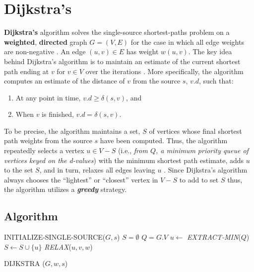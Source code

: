 \documentclass[a4paper, 12pt]{report}
\theoremstyle{definition}
\begin{document}
\section{Dijkstra's}
\label{sec:3.2}
\textbf{Dijkstra's} algorithm solves the single-source shortest-paths problem on a \textbf{weighted}, \textbf{directed} graph \(G = (V, E)\) for the case in which all edge weights are non-negative \cite{cormenBk}. An edge \((u, v) \in E\) has weight \(w(u, v)\).
The key idea behind Dijkstra's algorithm is to maintain an estimate of the current shortest path ending at \(v\) for \(v \in V\) over the iterations \cite{stand:bford:12}. More specifically, the algorithm computes an estimate of the distance of \(v\) from the source \(s\), \(v.d\), such that:
\begin{enumerate}
    \item At any point in time, \(v.d \geq \delta(s, v)\), and
    \item When \(v\) is finished, $v.d = \delta(s, v)$.
\end{enumerate}
To be precise, the algorithm maintains a set, \(S\) of vertices whose final shortest path weights from the source \(s\) have been computed. Thus, the algorithm repeatedly selects a vertex \(u \in V - S\) (i.e., \emph{from \(Q\), a minimum priority queue of vertices keyed on the d-values})
with the minimum shortest path estimate, adds \(u\) to the set \(S\), and in turn, relaxes all edges leaving \(u\) \cite{cormenBk,stand:bford:12}. Since Dijkstra's algorithm always chooses the ``lightest'' or ``closest'' vertex in \(V-S\) to add to set \(S\) thus, the algorithm utilizes a \emph{\textbf{greedy}} strategy.

\subsection{Algorithm}
\begin{center}
    \colorbox[gray]{0.95}{
      \begin{minipage}{0.7\textwidth}
        \SetAlgoLined
        \begin{algorithm}[H]
          \DontPrintSemicolon
          INITIALIZE-SINGLE-SOURCE(\(G, s\))\;
          $S = \emptyset$\;
          $Q = G.V$\;
          {
            $u \gets$ \emph{EXTRACT-MIN}(\(Q\))\;
            $S \gets S \cup \{u\}$\;
            {
                \emph{RELAX}(\(u, v, w\))\;
            }
          }
          \caption{\small\color{purple} DIJKSTRA \color{black}(\(G, w, s\)) \cite{cormenBk}}
          \label{alg:dijkstra}
        \end{algorithm}
      \end{minipage}}
\end{center}
\end{document}
